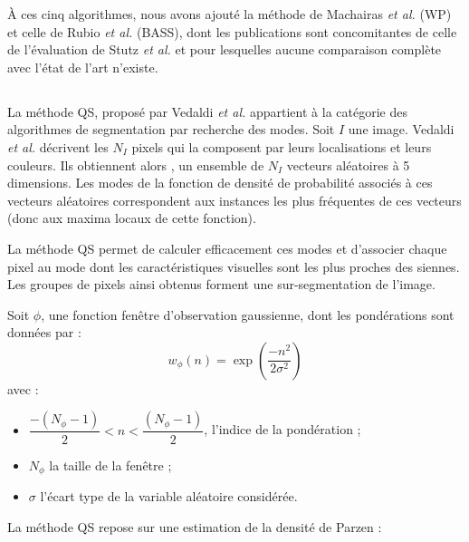 À ces cinq algorithmes, nous avons ajouté la méthode de Machairas \textit{et al.} \cite{machairas2015waterpixels} (WP) et celle de Rubio \textit{et al.} \cite{rubio2016bass} (BASS), dont les publications sont concomitantes de celle de l'évaluation de Stutz \textit{et al.} \cite{stutz2015superpixel} et pour lesquelles aucune comparaison complète avec l'état de l'art n'existe. 

\subsection{}
La méthode QS, proposé par Vedaldi \textit{et al.} \cite{vedaldi2008quick} appartient à la catégorie des algorithmes de segmentation par recherche des modes. Soit $I$ une image. Vedaldi \textit{et al.}  \cite{vedaldi2008quick} décrivent les $N_{I}$ pixels qui la composent par leurs localisations et leurs couleurs. Ils obtiennent alors ,  un  ensemble de $N_{I}$ vecteurs aléatoires à 5 dimensions. Les modes de la fonction de densité de probabilité associés à ces vecteurs aléatoires correspondent aux instances les plus fréquentes de ces vecteurs (donc aux maxima locaux de cette fonction).

La méthode QS permet de calculer efficacement ces modes et d'associer chaque pixel au mode dont les caractéristiques visuelles sont les plus proches des siennes. Les groupes de pixels ainsi obtenus forment une sur-segmentation de l'image. 

Soit $\phi$, une fonction fenêtre d'observation gaussienne, dont les pondérations sont données par :
\begin{equation}
w_{\phi}(n) = \exp \left( \dfrac{-n^{2}}{2\sigma^{2}} \right)
\end{equation} 
avec :
\begin{itemize}
\item $\dfrac{-(N_{\phi}-1)}{2} < n < \dfrac{(N_{\phi}-1)}{2}$, l'indice de la pondération ;
\item $N_{\phi}$ la taille de la fenêtre ; 
\item $\sigma$ l'écart type de la variable aléatoire considérée.  
\end{itemize}

La méthode QS \cite{vedaldi2008quick} repose sur une estimation de la densité de Parzen :
 
